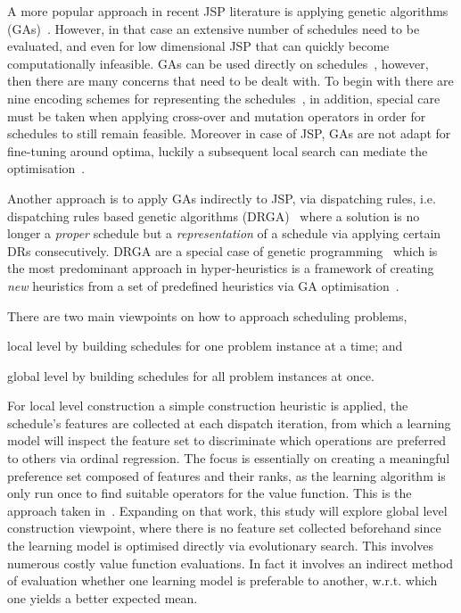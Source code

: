 \documentclass{acm_proc_article-sp}
\begin{document}
A more popular approach in recent JSP literature is applying genetic algorithms (GAs)~\cite{Pinedo08}. However, in that case an extensive number of schedules need to be evaluated, and even for low dimensional JSP that can quickly become computationally infeasible.
GAs can be used directly on schedules~\cite{Cheng96,Cheng99,Tsai07,Qing-dao-er-ji12,Ak12}, however, then there are many concerns that need to be dealt with. To begin with there are nine encoding schemes for representing the schedules~\cite{Cheng96}, in addition, special care must be taken when applying cross-over and mutation operators in order for schedules to still remain feasible. Moreover in case of JSP, GAs are not adapt for fine-tuning around optima, luckily a subsequent local search can mediate the optimisation~\cite{Cheng99}.

Another approach is to apply GAs indirectly to JSP, via dispatching rules, i.e. dispatching rules based genetic algorithms (DRGA)~\cite{Vazquez-Rodriguez09,Dhingra10,Nguyen13} where a solution is no longer a \emph{proper} schedule but a \emph{representation} of a schedule via applying certain DRs consecutively. 
DRGA are a special case of genetic programming~\cite{Koza05} which is the most predominant approach in hyper-heuristics is a framework of creating \emph{new} heuristics from a set of  predefined heuristics via GA optimisation~\cite{Burke10}. 

There are two main viewpoints on how to approach scheduling problems,
\begin{inparaenum} 
\item local level by building schedules for one problem instance at a time;
and \item global level by building schedules for all problem instances at once.
\end{inparaenum}
For local level construction a simple construction heuristic is applied, the schedule's features are collected at each dispatch iteration, from which a learning model will inspect the feature set to discriminate which operations are preferred to others via ordinal regression. The focus is essentially on creating a meaningful preference set composed of features and their ranks, as the learning algorithm is only run once to find suitable operators for the value function. This is the approach taken in~\cite{InRu11a}. Expanding on that  work, this study will explore global level construction viewpoint, where there is no feature set collected beforehand since the learning model is optimised directly via evolutionary search. This involves numerous costly value function evaluations. In fact it involves an indirect method of evaluation whether one learning model is preferable to another, w.r.t. which one yields a better expected mean. 
\end{document}
